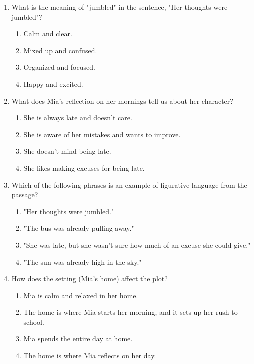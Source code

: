 \documentclass[12pt]{article}
\begin{document}
\begin{enumerate}
    \item What is the meaning of "jumbled" in the sentence, "Her thoughts were jumbled"?
    \begin{enumerate}[label=\Alph*.]
        \item Calm and clear.
        \item Mixed up and confused.
        \item Organized and focused.
        \item Happy and excited.
    \end{enumerate}
    \vspace{0.5cm}

    \item What does Mia’s reflection on her mornings tell us about her character?
    \begin{enumerate}[label=\Alph*.]
        \item She is always late and doesn’t care.
        \item She is aware of her mistakes and wants to improve.
        \item She doesn’t mind being late.
        \item She likes making excuses for being late.
    \end{enumerate}
    \vspace{0.5cm}

    \item Which of the following phrases is an example of figurative language from the passage?
    \begin{enumerate}[label=\Alph*.]
        \item "Her thoughts were jumbled."
        \item "The bus was already pulling away."
        \item "She was late, but she wasn’t sure how much of an excuse she could give."
        \item "The sun was already high in the sky."
    \end{enumerate}
    \vspace{0.5cm}

    \item How does the setting (Mia’s home) affect the plot?
    \begin{enumerate}[label=\Alph*.]
        \item Mia is calm and relaxed in her home.
        \item The home is where Mia starts her morning, and it sets up her rush to school.
        \item Mia spends the entire day at home.
        \item The home is where Mia reflects on her day.
    \end{enumerate}
    \vspace{0.5cm}


\end{enumerate}
\end{document}
